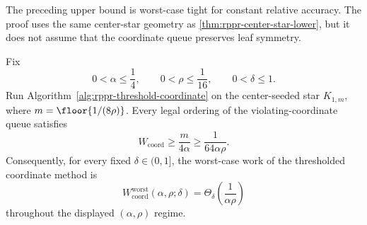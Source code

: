 The preceding upper bound is worst-case tight for constant relative
accuracy.  The proof uses the same center-star geometry as
\cref{thm:rppr-center-star-lower}, but it does not assume that the coordinate
queue preserves leaf symmetry.

\begin{theorem}
\label{thm:rppr-threshold-coordinate-lower}
Fix
\begin{equation}
    0<\alpha\leq\frac14,
    \qquad
    0<\rho\leq\frac1{16},
    \qquad
    0<\delta\leq1.
    \label{eq:rppr-coordinate-lower-range}
\end{equation}
Run Algorithm~\ref{alg:rppr-threshold-coordinate} on the center-seeded star
\(K_{1,m}\), where \(m=\floor{1/(8\rho)}\).  Every legal ordering of the
violating-coordinate queue satisfies
\begin{equation}
    W_{\mathrm{coord}}
    \geq\frac{m}{4\alpha}
    \geq\frac{1}{64\alpha\rho}.
    \label{eq:rppr-coordinate-star-lower}
\end{equation}
Consequently, for every fixed \(\delta\in(0,1]\), the worst-case work of the
thresholded coordinate method is
\begin{equation}
    W_{\mathrm{coord}}^{\mathrm{worst}}(\alpha,\rho;\delta)
    =\Theta_\delta\!\left(\frac1{\alpha\rho}\right)
    \label{eq:rppr-coordinate-tight}
\end{equation}
throughout the displayed \((\alpha,\rho)\) regime.
\end{theorem}

